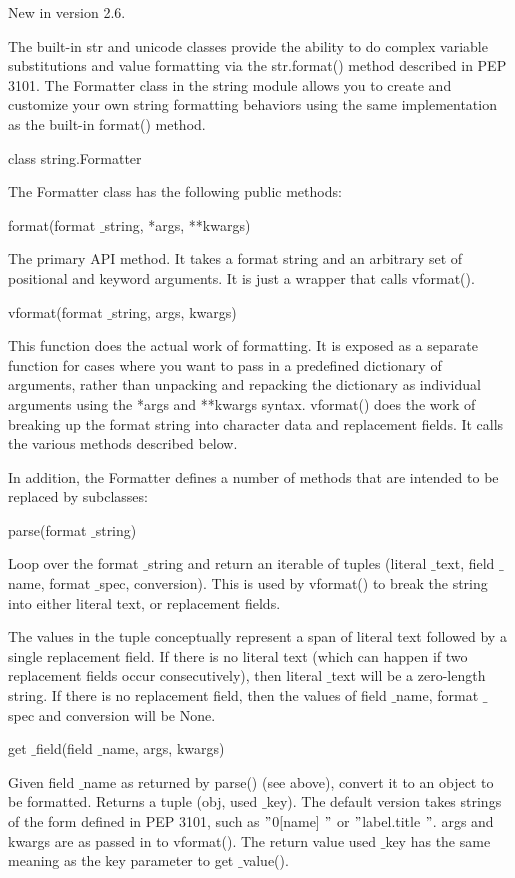 New in version 2.6. \par
The built-in str and unicode classes provide the ability to do complex variable substitutions and value formatting via the str.format() method described in PEP 3101. The Formatter class in the string module allows you to create and customize your own string formatting behaviors using the same implementation as the built-in format() method. \par
class string.Formatter \par
The Formatter class has the following public methods: \par
format(format $  \_  $string, *args, **kwargs) \par
The primary API method. It takes a format string and an arbitrary set of positional and keyword arguments. It is just a wrapper that calls vformat(). \par
vformat(format $  \_  $string, args, kwargs) \par
This function does the actual work of formatting. It is exposed as a separate function for cases where you want to pass in a predefined dictionary of arguments, rather than unpacking and repacking the dictionary as individual arguments using the *args and **kwargs syntax. vformat() does the work of breaking up the format string into character data and replacement fields. It calls the various methods described below. \par
In addition, the Formatter defines a number of methods that are intended to be replaced by subclasses: \par
parse(format $  \_  $string) \par
Loop over the format $  \_  $string and return an iterable of tuples (literal $  \_  $text, field $  \_  $name, format $  \_  $spec, conversion). This is used by vformat() to break the string into either literal text, or replacement fields. \par
The values in the tuple conceptually represent a span of literal text followed by a single replacement field. If there is no literal text (which can happen if two replacement fields occur consecutively), then literal $  \_  $text will be a zero-length string. If there is no replacement field, then the values of field $  \_  $name, format $  \_  $spec and conversion will be None. \par
get $  \_  $field(field $  \_  $name, args, kwargs) \par
Given field $  \_  $name as returned by parse() (see above), convert it to an object to be formatted. Returns a tuple (obj, used $  \_  $key). The default version takes strings of the form defined in PEP 3101, such as  $ " $0[name] $ " $ or  $ " $label.title $ " $. args and kwargs are as passed in to vformat(). The return value used $  \_  $key has the same meaning as the key parameter to get $  \_  $value(). \par

